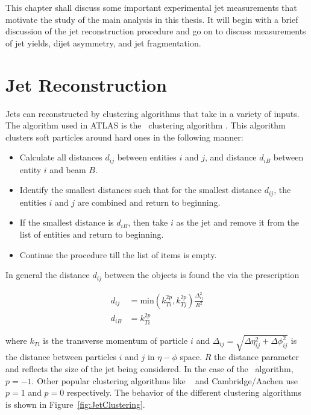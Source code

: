 This chapter shall discuss some important experimental jet measurements that motivate the study of the main analysis in this thesis. It will begin with a brief discussion of the jet reconstruction procedure and go on to discuss measurements of jet yields, dijet asymmetry, and jet fragmentation. 

\section{Jet Reconstruction}
Jets can reconstructed by clustering algorithms that take in a variety of inputs. The algorithm used in ATLAS is the \antikt\ clustering algorithm \cite{Cacciari:2008gp}. This algorithm clusters soft particles around hard ones in the following manner:

\begin{itemize}
\item Calculate all distances $d_{ij}$ between entities $i$ and $j$, and distance $d_{iB}$ between entity $i$ and beam $B$.
\item Identify the smallest distances such that for the smallest distance $d_{ij}$, the entities $i$ and $j$ are combined and return to beginning.
\item If the smallest distance is $d_{iB}$, then take $i$ as the jet and remove it from the list of entities and return to beginning.
\item Continue the procedure till the list of items is empty.
\end{itemize}

In general the distance $d_{ij}$ between the objects is found the via the prescription

\begin{align}
d_{ij} &= \mathrm{min} (k_{Ti}^{2p} , k_{Tj}^{2p}) \frac{\Delta_{ij}^2}{R^2}  \\
d_{iB} &= k_{Ti}^{2p}
\end{align}

where $k_{Ti}$ is the transverse momentum of particle $i$ and $\Delta_{ij} = \sqrt{\Delta\eta_{ij}^2 + \Delta\phi_{ij}^2}$ is the distance between particles $i$ and $j$ in $\eta-\phi$ space. $R$ the distance parameter and reflects the size of the jet being considered. In the case of the \antikt\ algorithm, $p = -1$. Other popular clustering algorithms like \kt\ \cite{Catani:1993hr} and Cambridge/Aachen \cite{Dokshitzer:1997in} use $p = 1$ and $p=0$ respectively. The behavior of the different clustering algorithms is shown in Figure~\ref{fig:JetClustering}. 

